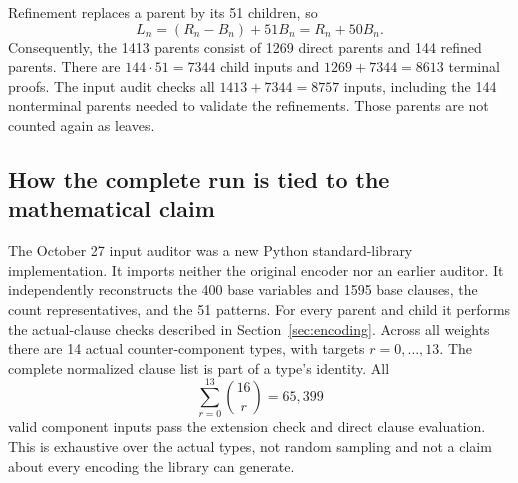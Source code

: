 \begin{table}[htbp]
\centering\small
\caption{Complete classification and the October 27 full replay.
$N_n=|\calA_n|$, $R_n=|\calR_n|$, $B_n$ counts refined parents, and
$L_n$ counts terminal proofs. Each addition total includes the final
empty clause of each proof.}\label{tab:counts}\label{tab:fresh-audit}

\end{table}

Refinement replaces a parent by its 51 children, so
\begin{equation}\label{eq:leaf-count}
L_n=(R_n-B_n)+51B_n=R_n+50B_n.
\end{equation}
Consequently, the 1413 parents consist of 1269 direct parents and 144
refined parents. There are $144\cdot51=7344$ child inputs and
$1269+7344=8613$ terminal proofs. The input audit checks all
$1413+7344=8757$ inputs, including the 144 nonterminal parents needed to
validate the refinements. Those parents are not counted again as leaves.

\subsection{How the complete run is tied to the mathematical claim}\label{sec:full-audit}
The October 27 input auditor was a new Python standard-library
implementation. It imports neither the original encoder nor an earlier
auditor. It independently reconstructs the 400 base variables and 1595
base clauses, the count representatives, and the 51 patterns. For every
parent and child it performs the actual-clause checks described in
Section~\ref{sec:encoding}. Across all weights there are 14 actual
counter-component types, with targets $r=0,\ldots,13$. The complete
normalized clause list is part of a type's identity. All
\[
\sum_{r=0}^{13}\binom{16}{r}=65,399
\]
valid component inputs pass the extension check and direct clause
evaluation. This is exhaustive over the actual types, not random
sampling and not a claim about every encoding the library can generate.

